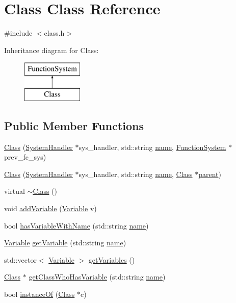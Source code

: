 \hypertarget{classClass}{}\section{Class Class Reference}
\label{classClass}


{\ttfamily \#include $<$class.\+h$>$}

Inheritance diagram for Class\+:\begin{figure}[H]
\begin{center}
\leavevmode
\includegraphics[height=2.000000cm]{classClass}
\end{center}
\end{figure}
\subsection*{Public Member Functions}
\begin{DoxyCompactItemize}
\item 
\hyperlink{classClass_a1c88be1af88c4c9b3c054d124ce44b6e}{Class} (\hyperlink{classSystemHandler}{System\+Handler} $\ast$sys\+\_\+handler, std\+::string \hyperlink{classClass_aac209ee2e03afc3bc9e93fd1fd46256b}{name}, \hyperlink{classFunctionSystem}{Function\+System} $\ast$prev\+\_\+fc\+\_\+sys)
\item 
\hyperlink{classClass_a1b960c202d43c46097e267e5c4e259ef}{Class} (\hyperlink{classSystemHandler}{System\+Handler} $\ast$sys\+\_\+handler, std\+::string \hyperlink{classClass_aac209ee2e03afc3bc9e93fd1fd46256b}{name}, \hyperlink{classClass}{Class} $\ast$\hyperlink{classClass_a1f94bc39c04d18b5c4421862f8506d1d}{parent})
\item 
virtual \hyperlink{classClass_aa3b9e4e0df41778f3d26777c1eb62898}{$\sim$\+Class} ()
\item 
void \hyperlink{classClass_a0c10b6fc7440f229da43f013271c0506}{add\+Variable} (\hyperlink{classVariable}{Variable} v)
\item 
bool \hyperlink{classClass_a0c5ffb0b7e3e95dedad01b8b4e91d93b}{has\+Variable\+With\+Name} (std\+::string \hyperlink{classClass_aac209ee2e03afc3bc9e93fd1fd46256b}{name})
\item 
\hyperlink{classVariable}{Variable} \hyperlink{classClass_a5c5de4f3c1419dedc92fc3d982fc6f65}{get\+Variable} (std\+::string \hyperlink{classClass_aac209ee2e03afc3bc9e93fd1fd46256b}{name})
\item 
std\+::vector$<$ \hyperlink{classVariable}{Variable} $>$ \hyperlink{classClass_ab24282751aa8b0ba2b2c71fbd3eef7e5}{get\+Variables} ()
\item 
\hyperlink{classClass}{Class} $\ast$ \hyperlink{classClass_aec836433f28bcfb9bf013ce79f24ba23}{get\+Class\+Who\+Has\+Variable} (std\+::string \hyperlink{classClass_aac209ee2e03afc3bc9e93fd1fd46256b}{name})
\item 
bool \hyperlink{classClass_a9bbffa241c269033a12c76f85af9c5ac}{instance\+Of} (\hyperlink{classClass}{Class} $\ast$c)
\end{DoxyCompactItemize}
